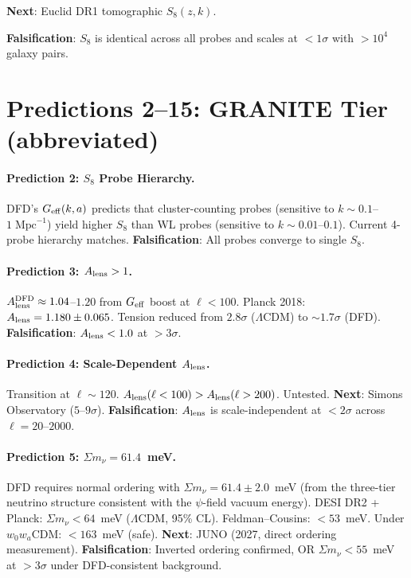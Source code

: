 \documentclass[11pt,a4paper]{article}
\newcommand{\LCDM}{$\Lambda$CDM}
\newcommand{\Geff}{G_{\rm eff}}
\begin{document}
\textbf{Next}: Euclid DR1 tomographic $S_8(z,k)$.

\textbf{Falsification}: $S_8$ is identical across all probes and
scales at $< 1\sigma$ with $> 10^4$ galaxy pairs.


\section{Predictions 2--15: GRANITE Tier (abbreviated)}

\paragraph{Prediction 2: $S_8$ Probe Hierarchy.}
DFD's $\Geff(k,a)$ predicts that cluster-counting probes (sensitive
to $k \sim 0.1$--$1\;\text{Mpc}^{-1}$) yield higher $S_8$ than WL
probes (sensitive to $k \sim 0.01$--$0.1$).  Current 4-probe
hierarchy matches.
\textbf{Falsification}: All probes converge to single $S_8$.

\paragraph{Prediction 3: $A_{\rm lens} > 1$.}
$A_{\rm lens}^{\rm DFD} \approx 1.04$--$1.20$ from $\Geff$ boost
at $\ell < 100$.  Planck 2018: $A_{\rm lens} = 1.180 \pm 0.065$.
Tension reduced from $2.8\sigma$ (\LCDM) to $\sim 1.7\sigma$ (DFD).
\textbf{Falsification}: $A_{\rm lens} < 1.0$ at $> 3\sigma$.

\paragraph{Prediction 4: Scale-Dependent $A_{\rm lens}$.}
Transition at $\ell \sim 120$.  $A_{\rm lens}(\ell < 100) >
A_{\rm lens}(\ell > 200)$.  Untested.
\textbf{Next}: Simons Observatory ($5$--$9\sigma$).
\textbf{Falsification}: $A_{\rm lens}$ is scale-independent at
$< 2\sigma$ across $\ell = 20$--$2000$.

\paragraph{Prediction 5: $\Sigma m_\nu = 61.4$~meV.}
DFD requires normal ordering with $\Sigma m_\nu = 61.4 \pm 2.0$~meV
(from the three-tier neutrino structure consistent with the
$\psi$-field vacuum energy).  DESI DR2 + Planck: $\Sigma m_\nu <
64$~meV ($\Lambda$CDM, 95\% CL).  Feldman--Cousins: $< 53$~meV.
Under $w_0 w_a$CDM: $< 163$~meV (safe).
\textbf{Next}: JUNO (2027, direct ordering measurement).
\textbf{Falsification}: Inverted ordering confirmed, OR
$\Sigma m_\nu < 55$~meV at $> 3\sigma$ under DFD-consistent
background.
\end{document}
